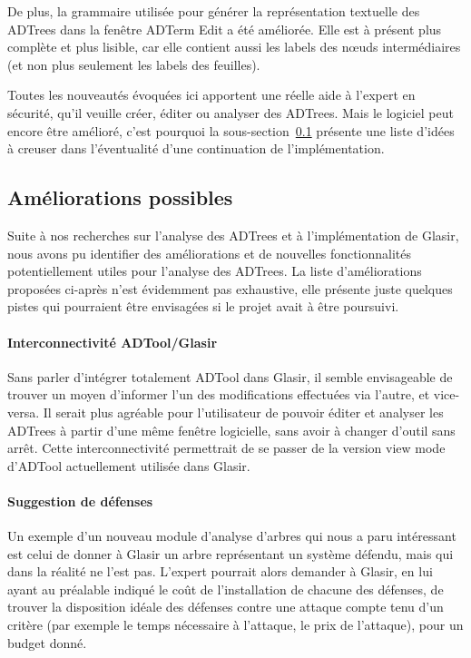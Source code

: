 De plus, la grammaire utilisée pour générer la représentation textuelle des ADTrees dans la fenêtre \og ADTerm Edit \fg{} a été améliorée. Elle est à présent plus complète et plus lisible, car elle contient aussi les labels des n\oe{}uds intermédiaires (et non plus seulement les labels des feuilles).

Toutes les nouveautés évoquées ici apportent une réelle aide à l'expert en sécurité, qu'il veuille créer, éditer ou analyser des ADTrees. Mais le logiciel peut encore être amélioré, c'est pourquoi la {\sc sous-section}~\ref{subsec:encorePlusMieux} présente une liste d'idées à creuser dans l'éventualité d'une continuation de l'implémentation.

\subsection{Améliorations possibles}
\label{subsec:encorePlusMieux}

Suite à nos recherches sur l'analyse des ADTrees et à l'implémentation de Glasir, nous avons pu identifier des améliorations et de nouvelles fonctionnalités potentiellement utiles pour l'analyse des ADTrees. La liste d'améliorations proposées ci-après n'est évidemment pas exhaustive, elle présente juste quelques pistes qui pourraient être envisagées si le projet avait à être poursuivi.

\paragraph{Interconnectivité ADTool/Glasir} Sans parler d'intégrer totalement ADTool dans Glasir, il semble envisageable de trouver un moyen d'informer l'un des modifications effectuées via l'autre, et vice-versa. Il serait plus agréable pour l'utilisateur de pouvoir éditer et analyser les ADTrees à partir d'une même fenêtre logicielle, sans avoir à changer d'outil sans arrêt. Cette interconnectivité permettrait de se passer de la version \og view mode \fg{} d'ADTool actuellement utilisée dans Glasir. 

\paragraph{Suggestion de défenses} Un exemple d'un nouveau module d'analyse d'arbres qui nous a paru intéressant est celui de donner à Glasir un arbre représentant un système défendu, mais qui dans la réalité ne l'est pas. L'expert pourrait alors demander à Glasir, en lui ayant au préalable indiqué le coût de l'installation de chacune des défenses, de trouver la disposition idéale des défenses contre une attaque compte tenu d'un critère (par exemple le temps nécessaire à l'attaque, le prix de l'attaque), pour un budget donné.

